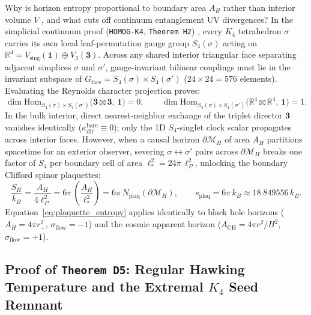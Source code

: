 \documentclass[11pt,a4paper]{article}
\theoremstyle{remark}
\begin{document}
Why is horizon entropy proportional to boundary area $A_H$ rather than interior volume $V$ \cite{Bekenstein1973,Hawking1975}, and what cuts off continuum entanglement UV divergences? In the simplicial continuum proof (\texttt{HOMOG-K4}, \texttt{Theorem H2}) \cite{JolcsakTauFoundationSeries2026}, every $K_4$ tetrahedron $\sigma$ carries its own local leaf-permutation gauge group $S_4(\sigma)$ acting on $\mathbb{R}^4 = V_{\mathrm{sing}}(\mathbf{1}) \oplus V_3(\mathbf{3})$. Across any shared interior triangular face separating adjacent simplices $\sigma$ and $\sigma'$, gauge-invariant bilinear couplings must lie in the invariant subspace of $G_{\mathrm{face}} = S_4(\sigma) \times S_4(\sigma')$ ($24 \times 24 = 576$ elements). Evaluating the Reynolds character projection proves:
\begin{equation}
  \dim \mathrm{Hom}_{S_4(\sigma)\times S_4(\sigma')}\bigl(\mathbf{3} \boxtimes \mathbf{3},\, \mathbf{1}\bigr) = 0, \qquad
  \dim \mathrm{Hom}_{S_4(\sigma)\times S_4(\sigma')}\bigl(\mathbb{R}^4 \boxtimes \mathbb{R}^4,\, \mathbf{1}\bigr) = 1.
  \label{eq:s4_reynolds_lock}
\end{equation}
In the bulk interior, direct nearest-neighbor exchange of the triplet director $\mathbf{3}$ vanishes identically ($\kappa_{\mathrm{dir}}^{\mathrm{bare}} \equiv 0$); only the 1D $S_4$-singlet clock scalar propagates across interior faces. However, when a causal horizon $\partial\mathcal{M}_H$ of area $A_H$ partitions spacetime for an exterior observer, severing $\sigma \leftrightarrow \sigma'$ pairs across $\partial\mathcal{M}_H$ breaks one factor of $S_4$ per boundary cell of area $\ell_*^2 = 24\pi\,\ell_P^2$, unlocking the boundary Clifford spinor plaquettes:
\begin{equation}
  \frac{S_H}{k_B} = \frac{A_H}{4\ell_P^2} = 6\pi\,\left(\frac{A_H}{\ell_*^2}\right) = 6\pi\,N_{\mathrm{plaq}}\!\left(\partial\mathcal{M}_H\right), \qquad s_{\mathrm{plaq}} = 6\pi\,k_B \approx 18.849556\,k_B.
  \label{eq:plaquette_entropy}
\end{equation}
Equation~\eqref{eq:plaquette_entropy} applies identically to black hole horizons ($A_H = 4\pi r_+^2$, $\sigma_{\mathrm{flow}} = -1$) and the cosmic apparent horizon ($A_{\mathrm{CH}} = 4\pi c^2/H^2$, $\sigma_{\mathrm{flow}} = +1$).

\subsection{Proof of \texttt{Theorem D5}: Regular Hawking Temperature and the Extremal \texorpdfstring{$K_4$}{K4} Seed Remnant}
\end{document}
